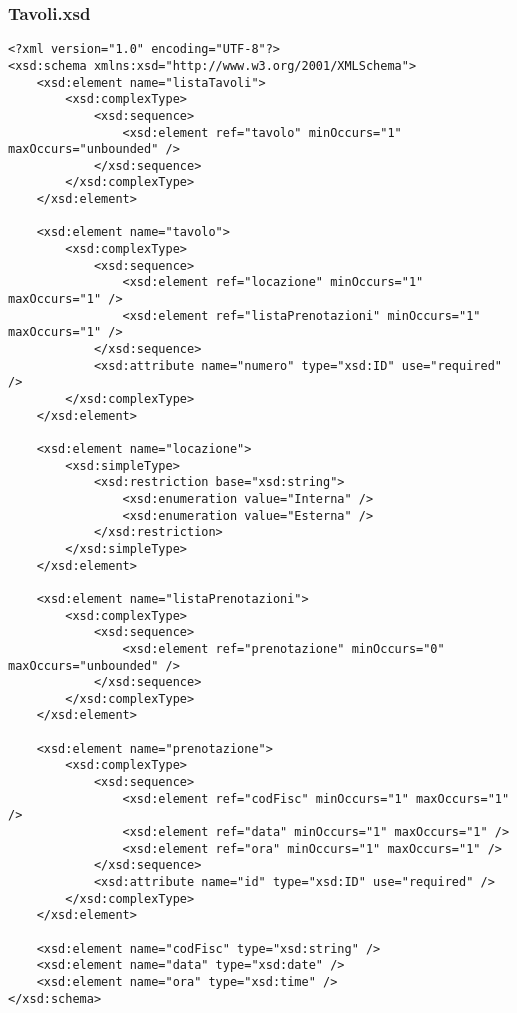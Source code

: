 \documentclass [a4paper, 12pt]{book}
\begin{document}
\subsubsection{Tavoli.xsd}
\begin{lstlisting}[style=XML]
<?xml version="1.0" encoding="UTF-8"?>
<xsd:schema xmlns:xsd="http://www.w3.org/2001/XMLSchema">
    <xsd:element name="listaTavoli">
        <xsd:complexType>
            <xsd:sequence>
                <xsd:element ref="tavolo" minOccurs="1" maxOccurs="unbounded" />
            </xsd:sequence>
        </xsd:complexType>
    </xsd:element>

    <xsd:element name="tavolo">
        <xsd:complexType>
            <xsd:sequence>
                <xsd:element ref="locazione" minOccurs="1" maxOccurs="1" />
                <xsd:element ref="listaPrenotazioni" minOccurs="1" maxOccurs="1" />
            </xsd:sequence>
            <xsd:attribute name="numero" type="xsd:ID" use="required" />
        </xsd:complexType>
    </xsd:element>

    <xsd:element name="locazione">
        <xsd:simpleType>
            <xsd:restriction base="xsd:string">
                <xsd:enumeration value="Interna" />
                <xsd:enumeration value="Esterna" />
            </xsd:restriction>
        </xsd:simpleType>
    </xsd:element>
    
    <xsd:element name="listaPrenotazioni">
        <xsd:complexType>
            <xsd:sequence>
                <xsd:element ref="prenotazione" minOccurs="0" maxOccurs="unbounded" />
            </xsd:sequence>
        </xsd:complexType>
    </xsd:element>

    <xsd:element name="prenotazione">
        <xsd:complexType>
            <xsd:sequence>
                <xsd:element ref="codFisc" minOccurs="1" maxOccurs="1" />
                <xsd:element ref="data" minOccurs="1" maxOccurs="1" />
                <xsd:element ref="ora" minOccurs="1" maxOccurs="1" />
            </xsd:sequence>
            <xsd:attribute name="id" type="xsd:ID" use="required" />
        </xsd:complexType>
    </xsd:element>

    <xsd:element name="codFisc" type="xsd:string" />
    <xsd:element name="data" type="xsd:date" />
    <xsd:element name="ora" type="xsd:time" />
</xsd:schema>
\end{lstlisting}

\medskip
\end{document}
